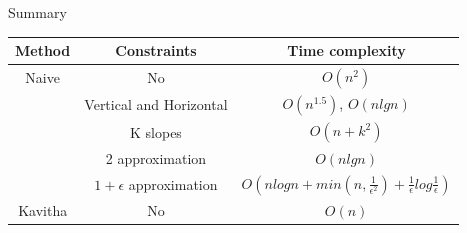 \documentclass{beamer}
\begin{document}





\begin{frame}{Summary}
    
  
  \centering
    \begin{tabular}{|c|c|c|}
         \hline
         Method & \textbf{Constraints} & \textbf{Time complexity} \\
         \hline
         Naive & No & $O(n^2)$ \\
         \hline
         \cite{eppstein1997efficient} & Vertical and Horizontal & $O(n^{1.5})$, $O(nlgn)$ \\
         \hline
         \cite{eppstein1999shortest} & K slopes & $O(n + k^2)$ \\
         \hline
         \cite{bose1996approximating} & 2 approximation & $O(nlgn)$ \\
         \hline
         \cite{hart2001approximating} & $1 + \epsilon$ approximation & $O(nlogn + min(n, \frac{1}{\epsilon^2}) + \frac{1}{\epsilon} log \frac{1}{\epsilon})$\\
         \hline
         \hline
         Kavitha & \alert{No} & \alert{$O(n)$} \\
         \hline
    \end{tabular}
\end{frame}
\end{document}
